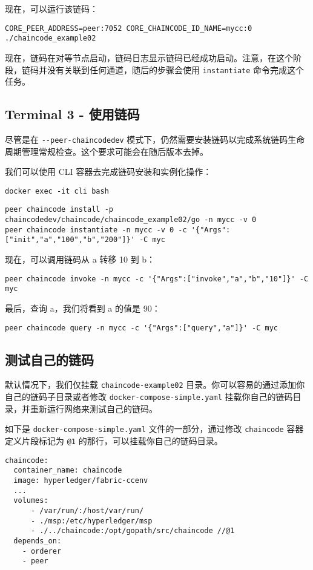 \documentclass[11pt]{article}
\begin{document}
现在，可以运行该链码：
\begin{verbatim}
CORE_PEER_ADDRESS=peer:7052 CORE_CHAINCODE_ID_NAME=mycc:0 ./chaincode_example02
\end{verbatim}

现在，链码在对等节点启动，链码日志显示链码已经成功启动。注意，在这个阶段，链码并没有关联到任何通道，随后的步骤会使用 \texttt{instantiate} 命令完成这个任务。

\subsection{Terminal 3 - 使用链码}
\label{sec-3-6}
尽管是在 \texttt{-{}-peer-chaincodedev} 模式下，仍然需要安装链码以完成系统链码生命周期管理常规检查。这个要求可能会在随后版本去掉。

我们可以使用 CLI 容器去完成链码安装和实例化操作：
\begin{verbatim}
docker exec -it cli bash
\end{verbatim}
\begin{verbatim}
peer chaincode install -p chaincodedev/chaincode/chaincode_example02/go -n mycc -v 0
peer chaincode instantiate -n mycc -v 0 -c '{"Args":["init","a","100","b","200"]}' -C myc
\end{verbatim}

现在，可以调用链码从 a 转移 10 到 b：
\begin{verbatim}
peer chaincode invoke -n mycc -c '{"Args":["invoke","a","b","10"]}' -C myc
\end{verbatim}

最后，查询 a，我们将看到 a 的值是 90：
\begin{verbatim}
peer chaincode query -n mycc -c '{"Args":["query","a"]}' -C myc
\end{verbatim}

\subsection{测试自己的链码}
\label{sec-3-7}
默认情况下，我们仅挂载 \texttt{chaincode-example02} 目录。你可以容易的通过添加你自己的链码子目录或者修改 \texttt{docker-compose-simple.yaml} 挂载你自己的链码目录，并重新运行网络来测试自己的链码。

如下是 \texttt{docker-compose-simple.yaml} 文件的一部分，通过修改 \texttt{chaincode} 容器定义片段标记为 \texttt{@1} 的那行，可以挂载你自己的链码目录。
\begin{verbatim}
chaincode:
  container_name: chaincode
  image: hyperledger/fabric-ccenv
  ...
  volumes:
      - /var/run/:/host/var/run/
      - ./msp:/etc/hyperledger/msp
      - ./../chaincode:/opt/gopath/src/chaincode //@1
  depends_on:
    - orderer
    - peer
\end{verbatim}
\end{document}
